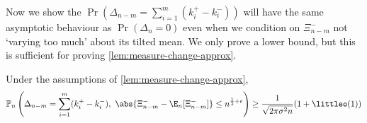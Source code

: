 Now we show the $\Pr(\Delta_{n-m} = \sum_{i=1}^m (k_i^+ - k_i^-))$ will have the same asymptotic behaviour as $\Pr(\Delta_n = 0)$ even when we condition on $\Xi_{n-m}^-$ not `varying too much' about its tilted mean. We only prove a lower bound, but this is sufficient for proving \cref{lem:measure-change-approx}.
\begin{lemma}
    \label{lem:mod-dev-local}
    Under the assumptions of \cref{lem:measure-change-approx},
    \begin{equation*}
        \mathbb P_n \left(
            \Delta_{n-m} = \sum_{i=1}^m (k_i^+ - k_i^-), \ 
            \abs{\Xi^-_{n-m} - \E_n[\Xi^-_{n-m}]} \leq n^{\frac{1}{2} + \epsilon}
        \right)
        \geq \frac{1}{\sqrt{2 \pi \sigma^2 n}} (1 + \littleo(1))
    \end{equation*}
\end{lemma}

